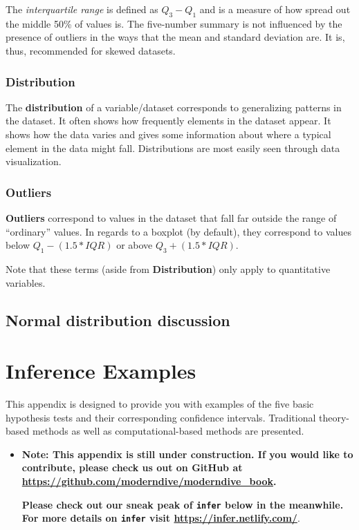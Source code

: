 \documentclass[12pt, krantz2,]{krantz}
\newenvironment{rmdblock}[1]
  {\begin{shaded*}
  \begin{itemize}
  \renewcommand{\labelitemi}{
    \raisebox{-.7\height}[0pt][0pt]{
    }
  }
  \item
  }
  {
  \end{itemize}
  \end{shaded*}
  }
\newenvironment{learncheck}
  {\begin{rmdblock}{warning}}
  {\end{rmdblock}}
\begin{document}
The \emph{interquartile range} is defined as \(Q_3 - Q_1\) and is a measure of how spread out the middle 50\% of values is. The five-number summary is not influenced by the presence of outliers in the ways that the mean and standard deviation are. It is, thus, recommended for skewed datasets.

\hypertarget{distribution}{%
\subsection{Distribution}\label{distribution}}

The \textbf{distribution} of a variable/dataset corresponds to generalizing patterns in the dataset. It often shows how frequently elements in the dataset appear. It shows how the data varies and gives some information about where a typical element in the data might fall. Distributions are most easily seen through data visualization.

\hypertarget{outliers}{%
\subsection{Outliers}\label{outliers}}

\textbf{Outliers} correspond to values in the dataset that fall far outside the range of ``ordinary'' values. In regards to a boxplot (by default), they correspond to values below \(Q_1 - (1.5 * IQR)\) or above \(Q_3 + (1.5 * IQR)\).

Note that these terms (aside from \textbf{Distribution}) only apply to quantitative variables.

\hypertarget{normal-distribution-discussion}{%
\section{Normal distribution discussion}\label{normal-distribution-discussion}}

\hypertarget{appendixB}{%
\chapter{Inference Examples}\label{appendixB}}

This appendix is designed to provide you with examples of the five basic hypothesis tests and their corresponding confidence intervals. Traditional theory-based methods as well as computational-based methods are presented.

\begin{learncheck}
\textbf{Note: This appendix is still under construction. If you would
like to contribute, please check us out on GitHub at
\url{https://github.com/moderndive/moderndive_book}.}

\textbf{Please check out our sneak peak of \texttt{infer} below in the
meanwhile. For more details on \texttt{infer} visit
\url{https://infer.netlify.com/}}.
\end{learncheck}
\end{document}
